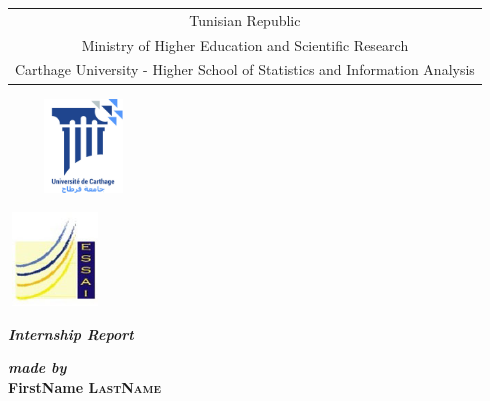 \documentclass{article}
\title{\reportSubject}
\author{\reportAuthor}
\newcommand{\reportTitle} {%
  \textsc{Projet de Fin d'\'etudes}
}
\newcommand{\reportAuthor} {%
  FirstName \textsc{LastName}%
}
\newcommand{\ESSAI} {%
  Higher School of Statistics and Information Analysis
}
\begin{document}
\thispagestyle{empty}
\begin{titlepage}
\begin{center}



{%
  \fontsize{9pt}{9pt}\selectfont%
  \begin{tabular}{c}
    Tunisian Republic\\
    Ministry of Higher Education and Scientific Research \\%
    Carthage University - \ESSAI{}  \\
  \end{tabular}
}

\vspace{1cm}

\includegraphics[width=4cm, height=2.5cm]{universite-carthage.jpg}

\includegraphics[width=2.5cm, height=2.5cm]{logo-essai.jpg}\\



\vspace{30pt} {%
  \renewcommand*{\familydefault}{\defaultFont}
  \fontsize{46pt}{46pt}\selectfont%
}

\vspace{10pt}
\textbf{\textit{Internship Report}}

\vspace{30pt}
\textbf{\textit{made by}}\\
\vspace{10pt} {%
  \fontsize{18pt}{18pt}\selectfont%
  \textbf{\reportAuthor}\\
}%


\end{center}
\end{titlepage}
\end{document}
